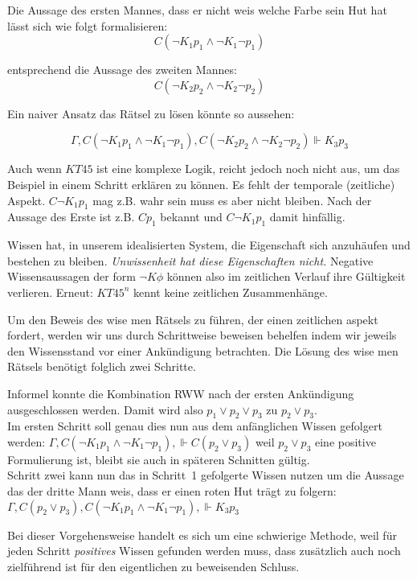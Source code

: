 Die Aussage des ersten Mannes, dass er nicht weis welche Farbe sein Hut hat lässt sich wie folgt formalisieren:
\begin{equation*}
	C(\neg K_1 p_1 \wedge \neg K_1 \neg p_1)
\end{equation*}

entsprechend die Aussage des zweiten Mannes:
\begin{equation*}
	C(\neg K_2 p_2 \wedge \neg K_2 \neg p_2)
\end{equation*}

Ein naiver Ansatz das Rätsel zu lösen könnte so aussehen:

\begin{equation}
	\Gamma, C(\neg K_1 p_1 \wedge \neg K_1 \neg p_1), C(\neg K_2 p_2 \wedge \neg K_2 \neg p_2) \Vdash K_3 p_3
\end{equation}

Auch wenn $KT45$ ist eine komplexe Logik, reicht jedoch noch nicht aus, um das Beispiel in einem Schritt erklären zu können.
Es fehlt der temporale (zeitliche) Aspekt.
$C \neg K_1 p_1$ mag z.B. wahr sein muss es aber nicht bleiben.
Nach der Aussage des Erste ist z.B. $C p_1$ bekannt und $C \neg K_1 p_1$ damit hinfällig.

Wissen hat, in unserem idealisierten System, die Eigenschaft sich anzuhäufen und bestehen zu bleiben. 
\emph{Unwissenheit hat diese Eigenschaften nicht.}
Negative Wissensaussagen der form $\neg K \phi$ können also im zeitlichen Verlauf ihre Gültigkeit verlieren.
Erneut: $KT45^n$ kennt keine zeitlichen Zusammenhänge.

Um den Beweis des wise men Rätsels zu führen, der einen zeitlichen aspekt fordert, werden wir uns durch Schrittweise beweisen behelfen indem wir jeweils den Wissensstand vor einer Ankündigung betrachten.
Die Lösung des wise men Rätsels benötigt folglich zwei Schritte.

Informel konnte die Kombination RWW nach der ersten Ankündigung ausgeschlossen werden.
Damit wird also $p_1 \vee p_2 \vee p_3$ zu $p_2 \vee p_3$.\\
Im ersten Schritt soll genau dies nun aus dem anfänglichen Wissen gefolgert werden:
$\Gamma, C(\neg K_1 p_1 \wedge \neg K_1 \neg p_1), \Vdash C(p_2 \vee p_3)$
weil $p_2 \vee p_3$ eine positive Formulierung ist, bleibt sie auch in späteren Schnitten gültig.\\
Schritt zwei kann nun das in Schritt~1 gefolgerte Wissen nutzen um die Aussage das der dritte Mann weis, dass er einen roten Hut trägt zu folgern:
$\Gamma, C(p_2 \vee p_3), C(\neg K_1 p_1 \wedge \neg K_1 \neg p_1), \Vdash K_3 p_3$

Bei dieser Vorgehensweise handelt es sich um eine schwierige Methode, weil für jeden Schritt \emph{positives} Wissen gefunden werden muss, dass zusätzlich auch noch zielführend ist für den eigentlichen zu beweisenden Schluss.









